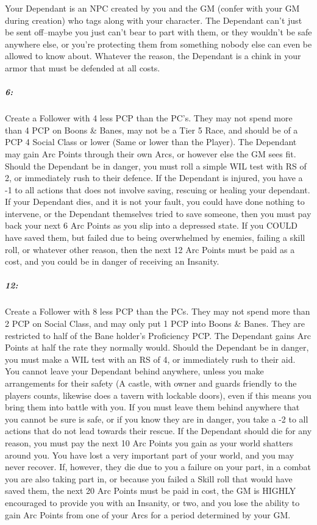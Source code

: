 \documentclass[oneside,11pt,english]{book}
\begin{document}
Your Dependant is an NPC created by you and the GM (confer with your GM during creation) who tags 
along with your character. The Dependant can’t just be sent off--maybe you just can’t bear to part with 
them, or they wouldn’t be safe anywhere else, or you’re protecting them from something nobody else can 
even be allowed to know about. Whatever the reason, the Dependant is a chink in your armor that must be 
defended at all costs. 
\subparagraph{6:} Create a Follower with 4 less PCP than the PC’s. They may not
spend more than 4 PCP on Boons \& Banes, may not be a Tier 5 Race, and should be
of a PCP 4 Social Class or lower (Same or lower than the Player). The Dependant
may gain Arc Points through their own Arcs, or however else the GM sees fit.
Should the Dependant be in danger, you must roll a simple WIL test with RS of 2,
or immediately rush to their defence. If the Dependant is injured, you have a -1
to all actions that does not involve saving, rescuing or healing your dependant.
If your Dependant dies, and it is not your fault, you could have done nothing to
intervene, or the Dependant themselves tried to save someone, then you must pay
back your next 6 Arc Points as you slip into a depressed state. If you COULD
have saved them, but failed due to being overwhelmed by enemies, failing a skill
roll, or whatever other reason, then the next 12 Arc Points must be paid as a
cost, and you could be in danger of receiving an Insanity.\par 

\subparagraph{12:} Create a Follower with 8 less PCP than the PCs. They may not
spend more than 2 PCP on Social Class, and may only put 1 PCP into Boons \&
Banes. They are restricted to half of the Bane holder’s Proficiency PCP. The
Dependant gains Arc Points at half the rate they normally would. Should the
Dependant be in danger, you must make a WIL test with an RS of 4, or immediately
rush to their aid. You cannot leave your Dependant behind anywhere, unless you
make arrangements for their safety (A castle, with owner and guards friendly to
the players counts, likewise does a tavern with lockable doors), even if this
means you bring them into battle with you. If you must leave them behind
anywhere that you cannot be sure is safe, or if you know they are in danger, you
take a -2 to all actions that do not lead towards their rescue. If the Dependant
should die for any reason, you must pay the next 10 Arc Points you gain as your
world shatters around you. You have lost a very important part of your world,
and you may never recover. If, however, they die due to you a failure on your
part, in a combat you are also taking part in, or because you failed a Skill
roll that would have saved them, the next 20 Arc Points must be paid in cost,
the GM is HIGHLY encouraged to provide you with an Insanity, or two, and you
lose the ability to gain Arc Points from one of your Arcs for a period
determined by your GM.\par 
\end{document}
